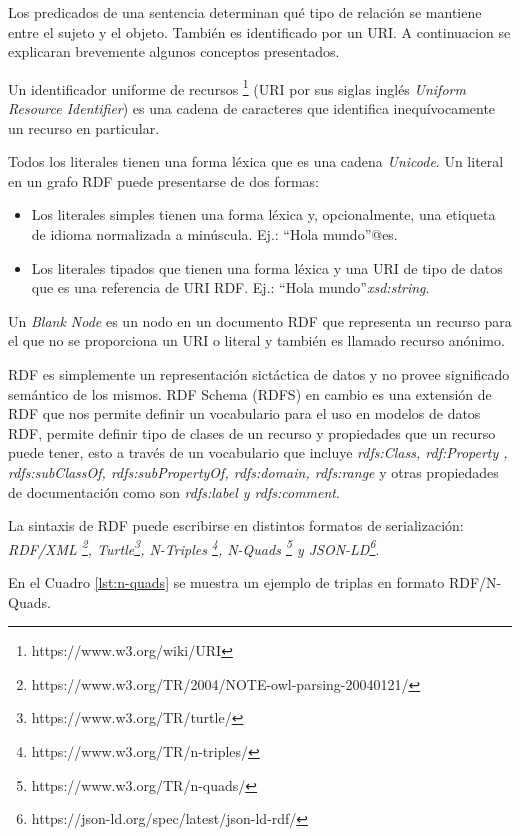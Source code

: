 Los predicados de una sentencia determinan qué tipo de relación se mantiene entre el sujeto y el objeto. También es identificado por un URI. A continuacion se explicaran brevemente algunos conceptos presentados.

Un identificador uniforme de recursos \footnote{https://www.w3.org/wiki/URI} (URI por sus siglas inglés \textit{Uniform Resource Identifier}) es una cadena de caracteres que identifica inequívocamente un recurso en particular. 

Todos los literales tienen una forma léxica que es una cadena \textit{Unicode}. Un literal en un grafo RDF puede presentarse de dos formas:
\begin{itemize}
    \item Los literales simples tienen una forma léxica y, opcionalmente, una etiqueta de idioma normalizada a minúscula. Ej.: “Hola mundo”@es.
    \item Los literales tipados que tienen una forma léxica y una URI de tipo de datos que es una referencia de URI RDF. Ej.: “Hola mundo”\textit{xsd:string}.
\end{itemize}

Un \textit{Blank Node} es un nodo en un documento RDF que representa un recurso para el que no se proporciona un URI o literal y también es llamado recurso anónimo.

RDF es simplemente un representación sictáctica de datos y no provee significado semántico de los mismos. RDF Schema (RDFS) en cambio es una extensión de RDF que nos permite definir un vocabulario para el uso en modelos de datos RDF, permite definir tipo de clases de un recurso y propiedades que un recurso puede tener, esto a través de un vocabulario que incluye\textit{ rdfs:Class, rdf:Property , rdfs:subClassOf, rdfs:subPropertyOf, rdfs:domain, rdfs:range} y otras propiedades de documentación como son \textit{rdfs:label y rdfs:comment}.

La sintaxis de RDF puede escribirse en distintos formatos de serialización: \textit{RDF/XML \footnote{https://www.w3.org/TR/2004/NOTE-owl-parsing-20040121/}, Turtle\footnote{https://www.w3.org/TR/turtle/}, N-Triples \footnote{https://www.w3.org/TR/n-triples/}, N-Quads \footnote{https://www.w3.org/TR/n-quads/} y JSON-LD\footnote{https://json-ld.org/spec/latest/json-ld-rdf/}}.

En el Cuadro \ref{lst:n-quads} se muestra un ejemplo de triplas en formato RDF/N-Quads. \hfill \break

\lstset{language=XML}
    
